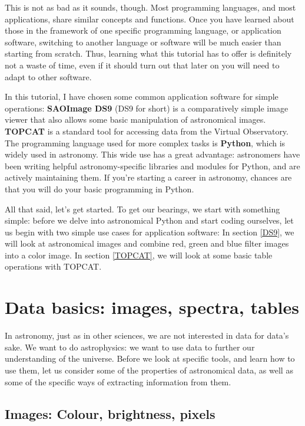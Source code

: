\documentclass[twocolumn,apj]{openjournal}
\begin{document}
This is not as bad as it sounds, though. Most programming languages, and most applications, share similar concepts and functions. Once you have learned about those in the framework of one specific programming language, or application software, switching to another language or software will be much easier than starting from scratch. Thus, learning what this tutorial has to offer is definitely not a waste of time, even if it should turn out that later on you will need to adapt to other software.

In this tutorial, I have chosen some common application software for simple operations: {\bf SAOImage DS9} (DS9 for short) is a comparatively simple image viewer that also allows some basic manipulation of astronomical images. {\bf TOPCAT} is a standard tool for accessing data from the Virtual Observatory. The programming language used for more complex tasks is {\bf Python}, which is widely used in astronomy. This wide use has a great advantage: astronomers have been writing helpful astronomy-specific libraries and modules for Python, and are actively maintaining them. If you're starting a career in astronomy, chances are that you will do your basic programming in Python.

All that said, let's get started. To get our bearings, we start with something simple: before we delve into astronomical Python and start coding ourselves, let us begin with two simple use cases for application software: In section \ref{DS9}, we will look at astronomical images and combine red, green and blue filter images into a color image. In section
\ref{TOPCAT}, we will look at some basic table operations with TOPCAT.

\section{Data basics: images, spectra, tables}
\label{DataBasics}

In astronomy, just as in other sciences, we are not interested in data for data's sake. We want to do astrophysics: we want to use data to further our understanding of the universe. Before we look at specific tools, and learn how to use them, let us consider some of the properties of astronomical data, as well as some of the specific ways of extracting information from them.

\subsection{Images: Colour, brightness, pixels}
\label{ImagesBasics}
\end{document}
